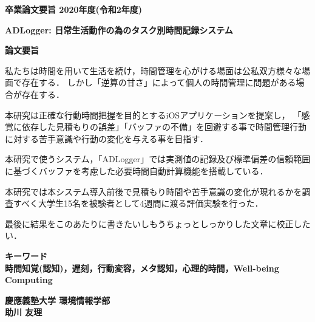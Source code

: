 \begin{center}
\textbf{\Large 卒業論文要旨 2020年度(令和2年度)}

\vspace{6.18mm}

\textbf{\Large ADLogger: 日常生活動作の為のタスク別時間記録システム}
\end{center}

\vspace{10mm}

\begin{flushleft}
\textbf{論文要旨}\\
\end{flushleft}

私たちは時間を用いて生活を続け，時間管理を心がける場面は公私双方様々な場面で存在する．
しかし「逆算の甘さ」によって個人の時間管理に問題がある場合が存在する．

本研究は正確な行動時間把握を目的とするiOSアプリケーションを提案し，
「感覚に依存した見積もりの誤差」「バッファの不備」を回避する事で時間管理行動に対する苦手意識や行動の変化を与える事を目指す．

本研究で使うシステム，「ADLogger」では実測値の記録及び標準偏差の信頼範囲に基づくバッファを考慮した必要時間自動計算機能を搭載している．

本研究では本システム導入前後で見積もり時間や苦手意識の変化が現れるかを調査すべく大学生15名を被験者として4週間に渡る評価実験を行った．

最後に結果をこのあたりに書きたいしもうちょっとしっかりした文章に校正したい．

\begin{flushleft}
\textbf{キーワード}\\
\textbf{時間知覚(認知)，遅刻，行動変容，メタ認知，心理的時間，Well-being Computing}

\end{flushleft}

\begin{flushright}
\textbf{慶應義塾大学 環境情報学部}\\
\textbf{助川 友理}
\end{flushright}
\newpage

